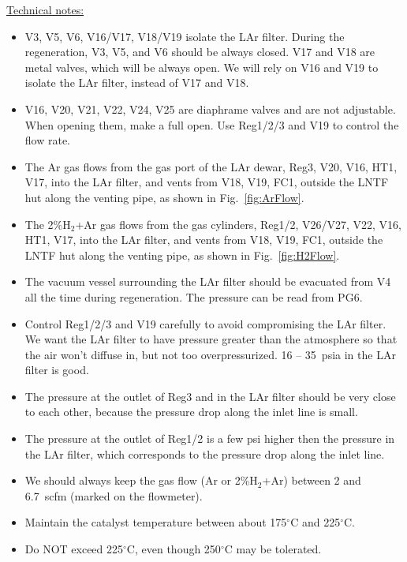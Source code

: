 \documentclass[letterpaper,11pt]{article}
\newcommand{\Hydro}     {H$_2$}
\newcommand{\dC}        {$^\circ$C}
\begin{document}
\underline{Technical notes:}
\begin{itemize}
\setlength\itemsep{-0.2em}
\item V3, V5, V6, V16/V17, V18/V19 isolate the LAr filter.  
During the regeneration, V3, V5, and V6 should be always closed.  
V17 and V18 are metal valves, which will be always open.
We will rely on V16 and V19 to isolate the LAr filter, instead of V17 and V18.
\item V16, V20, V21, V22, V24, V25 are diaphrame valves and are not adjustable.
When opening them, make a full open.
Use Reg1/2/3 and V19 to control the flow rate.
\item The Ar gas flows from the gas port of the LAr dewar, Reg3, V20, V16, HT1, V17, into the LAr filter, 
and vents from V18, V19, FC1, outside the LNTF hut along the venting pipe, as shown in 
Fig.~\ref{fig:ArFlow}.
\item The 2\%{\Hydro}+Ar gas flows from the gas cylinders, Reg1/2, V26/V27, V22, V16, HT1, V17, 
into the LAr filter, 
and vents from V18, V19, FC1, outside the LNTF hut along the venting pipe, 
as shown in Fig.~\ref{fig:H2Flow}.
\item The vacuum vessel surrounding the LAr filter should be evacuated from V4 all the time 
during regeneration.  
The pressure can be read from PG6.
\item Control Reg1/2/3 and V19 carefully to avoid compromising the LAr filter.  
We want the LAr filter to have pressure 
greater than the atmosphere so that the air won't diffuse in, but not too overpressurized.  
16 -- 35~psia in the LAr filter is good.
\item The pressure at the outlet of Reg3 and in the LAr filter should be very close to each other,
because the pressure drop along the inlet line is small.
\item The pressure at the outlet of Reg1/2 is a few psi higher then the pressure in the LAr filter,
which corresponds to the pressure drop along the inlet line. 
\item We should always keep the gas flow (Ar or 2\%{\Hydro}+Ar) between 2 and 6.7~scfm 
(marked on the flowmeter).
\item Maintain the catalyst temperature between about 175{\dC} and 225{\dC}.
\item Do NOT exceed 225{\dC}, even though 250{\dC} may be tolerated.

\end{itemize}
\end{document}

